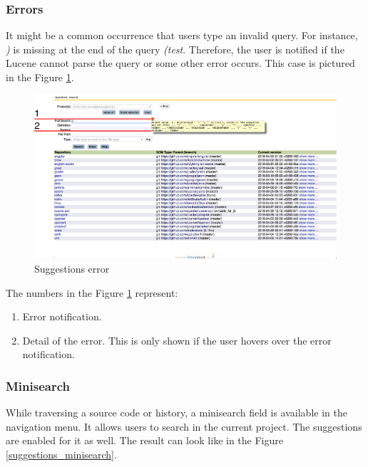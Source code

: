 \subsubsection{Errors}
It might be a common occurrence that users type an invalid query. For instance, \textit{)} is missing at the end of
the query \textit{(test}. Therefore, the user is notified if the Lucene cannot parse the query or some other
error occurs. This case is pictured in the Figure \ref{suggestions_error}.

\begin{figure}[htbp]
    \centering
    \includegraphics[width=145mm]{../img/suggestions_error.png}
    \caption{Suggestions error}
    \label{suggestions_error}
\end{figure}

The numbers in the Figure \ref{suggestions_error} represent:
\begin{enumerate}
    \item Error notification.
    \item Detail of the error. This is only shown if the user hovers over the error notification.
\end{enumerate}

\subsubsection{Minisearch}
While traversing a source code or history, a minisearch field is available in the navigation menu. It allows users
to search in the current project. The suggestions are enabled for it as well. The result can look like in the Figure
\ref{suggestions_minisearch}.

